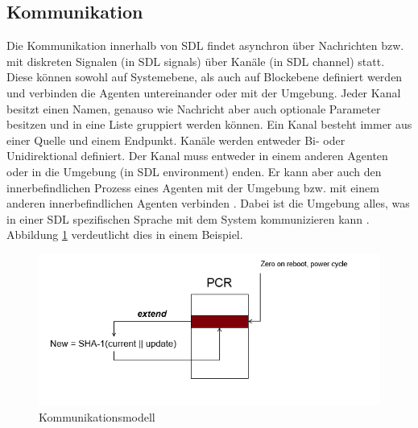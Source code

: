 \subsection{Kommunikation}
\label{ssc:Kommunikation}
Die Kommunikation innerhalb von \ac{SDL} findet asynchron über Nachrichten bzw. mit diskreten Signalen (in \ac{SDL} signals) über Kanäle (in \ac{SDL} channel) statt. 
Diese können sowohl auf Systemebene, als auch auf Blockebene definiert werden und verbinden die Agenten untereinander oder mit der Umgebung.
Jeder Kanal besitzt einen Namen, genauso wie Nachricht aber auch optionale Parameter besitzen und in eine Liste gruppiert werden können.
Ein Kanal besteht immer aus einer Quelle und einem Endpunkt. Kanäle werden entweder Bi- oder Unidirektional definiert. Der Kanal muss entweder in einem anderen Agenten oder in die Umgebung (in \ac{SDL} environment) enden. Er kann aber auch den innerbefindlichen Prozess eines Agenten mit der Umgebung bzw. mit einem anderen innerbefindlichen Agenten verbinden \cite[39-42]{ITUT101_2016}. Dabei ist die Umgebung alles, was in einer \ac{SDL} spezifischen Sprache mit dem System kommunizieren kann \cite[3\psq]{ITUT100_2016}.
Abbildung \ref{fig:KommModell} verdeutlicht dies in einem Beispiel.
 
\begin{figure}[ht]
	\centering
	\includegraphics[width=1\textwidth]{test.png}
	\caption{Kommunikationsmodell}
	\label{fig:KommModell}
\end{figure}

